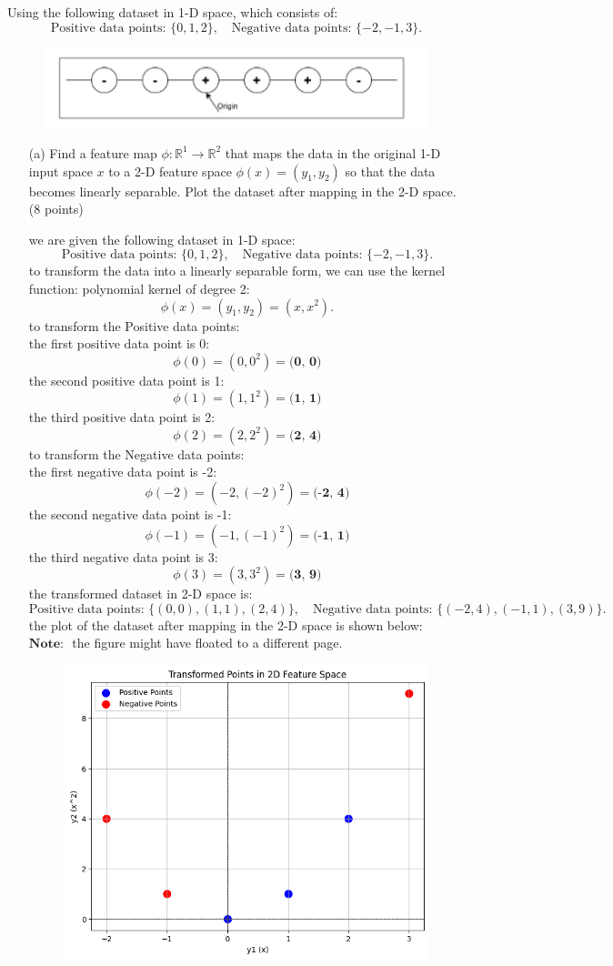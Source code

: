 \documentclass[a3paper,12pt]{article} %
\begin{document}
Using the following dataset in 1-D space, which consists of:
\[
\text{Positive data points: } \{0, 1, 2\}, \quad \text{Negative data points: } \{-2, -1, 3\}.
\]

\begin{figure}[h!]
    \centering
    \includegraphics[width=0.5\linewidth]{drawio.png}
    \label{fig:enter-label}
\end{figure}


\begin{enumerate}
    \item[(a)] Find a feature map $\phi : \mathbb{R}^1 \to \mathbb{R}^2$ that maps the data in the original 1-D input space $x$ to a 2-D feature space $\phi(x) = (y_1, y_2)$ so that the data becomes linearly separable. Plot the dataset after mapping in the 2-D space. \hfill (8 points)
   
    we are given the following dataset in 1-D space:
    \[
    \text{Positive data points: } \{0, 1, 2\}, \quad \text{Negative data points: } \{-2, -1, 3\}.
    \]
    to transform the data into a linearly separable form, we can use the kernel function: polynomial kernel of degree 2:
    \[
    \phi(x) = (y_1, y_2) = (x, x^2).
    \]
    to transform the Positive data points:
    \\ the first positive data point is 0:
    \[
    \phi(0) = (0, 0^2) = \textbf{(0, 0)}
    \]
    the second positive data point is 1:
    \[
    \phi(1) = (1, 1^2) = \textbf{(1, 1)}
    \]
    the third positive data point is 2:
    \[
    \phi(2) = (2, 2^2) = \textbf{(2, 4)}
    \]
    to transform the Negative data points:
    \\ the first negative data point is -2:
    \[
    \phi(-2) = (-2, (-2)^2) = \textbf{(-2, 4)}
    \]
    the second negative data point is -1:
    \[
    \phi(-1) = (-1, (-1)^2) = \textbf{(-1, 1)}
    \]
    the third negative data point is 3:
    \[
    \phi(3) = (3, 3^2) = \textbf{(3, 9)}
    \]
    the transformed dataset in 2-D space is:
    \[
    \text{Positive data points: } \{(0, 0), (1, 1), (2, 4)\}, \quad \text{Negative data points: } \{(-2, 4), (-1, 1), (3, 9)\}.
    \]
    the plot of the dataset after mapping in the 2-D space is shown below:
   \(\textbf{Note: }\)  the figure might have floated to a different page.
    \begin{figure}[h!]
        \centering
        \includegraphics[width=0.5\linewidth]{2D_space.png}
    \label{fig:2D space}
    \end{figure}
    



\end{enumerate}
\end{document}
